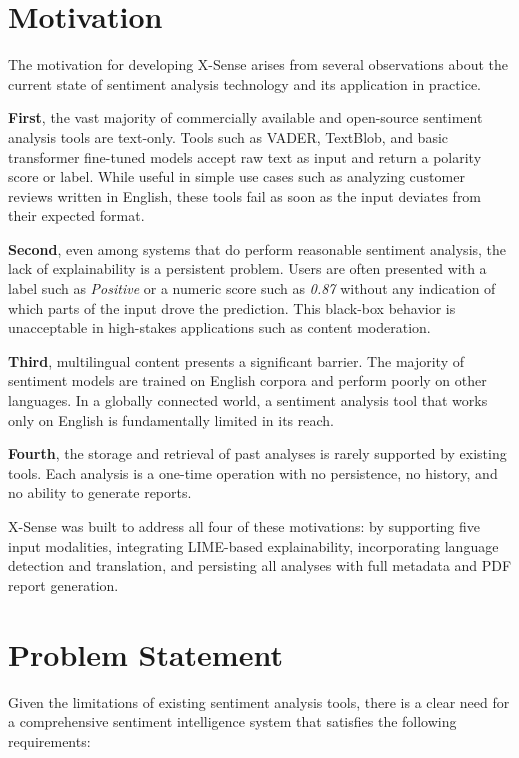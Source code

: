 \documentclass[12pt, a4paper]{report}
\begin{document}
\section{Motivation}

The motivation for developing X-Sense arises from several observations about the current state of sentiment analysis technology and its application in practice.

\textbf{First}, the vast majority of commercially available and open-source sentiment analysis tools are text-only. Tools such as VADER, TextBlob, and basic transformer fine-tuned models accept raw text as input and return a polarity score or label. While useful in simple use cases such as analyzing customer reviews written in English, these tools fail as soon as the input deviates from their expected format.

\textbf{Second}, even among systems that do perform reasonable sentiment analysis, the lack of explainability is a persistent problem. Users are often presented with a label such as \textit{Positive} or a numeric score such as \textit{0.87} without any indication of which parts of the input drove the prediction. This black-box behavior is unacceptable in high-stakes applications such as content moderation.

\textbf{Third}, multilingual content presents a significant barrier. The majority of sentiment models are trained on English corpora and perform poorly on other languages. In a globally connected world, a sentiment analysis tool that works only on English is fundamentally limited in its reach.

\textbf{Fourth}, the storage and retrieval of past analyses is rarely supported by existing tools. Each analysis is a one-time operation with no persistence, no history, and no ability to generate reports.

X-Sense was built to address all four of these motivations: by supporting five input modalities, integrating LIME-based explainability, incorporating language detection and translation, and persisting all analyses with full metadata and PDF report generation.

\section{Problem Statement}

Given the limitations of existing sentiment analysis tools, there is a clear need for a comprehensive sentiment intelligence system that satisfies the following requirements:
\end{document}
